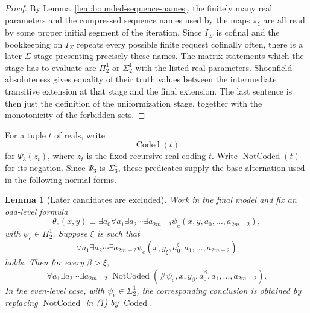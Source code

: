 \documentclass[11pt]{article}
\theoremstyle{plain}
\newtheorem{lemma}[theorem]{Lemma}
\theoremstyle{definition}
\theoremstyle{remark}
\newcommand{\PsiThree}{\Psi_{3}}
\begin{document}
\begin{proof}
By Lemma~\ref{lem:bounded-sequence-names}, the finitely many real parameters and
the compressed sequence names used by the maps $\pi_\xi$ are all read by some
proper initial segment of the iteration.  Since $I_\Sigma$ is cofinal and the
bookkeeping on $I_\Sigma$ repeats every possible finite request cofinally often,
there is a later $\Sigma$-stage presenting precisely these names.  The matrix
statements which the stage has to evaluate are $\Pi^1_2$ or $\Sigma^1_2$ with the
listed real parameters.  Shoenfield absoluteness gives equality of their truth
values between the intermediate transitive extension at that stage and the final
extension.  The last sentence is then just the definition of the uniformization
stage, together with the monotonicity of the forbidden sets.
\end{proof}

For a tuple $t$ of reals, write
\[
\operatorname{Coded}(t)
\]
for $\PsiThree(z_t)$, where $z_t$ is the fixed recursive real coding $t$.  Write
$\operatorname{NotCoded}(t)$ for its negation.  Since $\PsiThree$ is
$\Sigma^1_3$, these predicates supply the base alternation used in the following
normal forms.

\begin{lemma}[Later candidates are excluded]\label{lem:later-excluded}
Work in the final model and fix an odd-level formula
\[
\theta_e(x,y)\equiv \exists a_0\forall a_1\exists a_2\cdots\exists a_{2m-2}
\psi_e(x,y,a_0,
\ldots,a_{2m-2}),
\]
with $\psi_e\in\Pi^1_2$.  Suppose $\xi$ is such that
\[
\forall a_1\exists a_2\cdots\exists a_{2m-2}
\psi_e(x,y_\xi,a^\xi_0,a_1,\ldots,a_{2m-2})
\]
holds.  Then for every $\beta>\xi$,
\[
\forall a_1\exists a_2\cdots\exists a_{2m-2}\;
\operatorname{NotCoded}(\#\psi_e,x,y_\beta,a^\beta_0,a_1,\ldots,a_{2m-2}).
\tag{1}
\]
In the even-level case, with $\psi_e\in\Sigma^1_2$, the corresponding conclusion
is obtained by replacing $\operatorname{NotCoded}$ in (1) by
$\operatorname{Coded}$.
\end{lemma}
\end{document}
